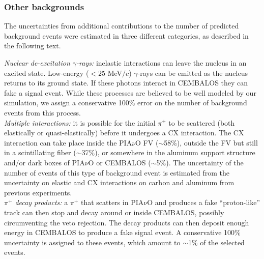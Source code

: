 \subsubsection{\bf Other backgrounds}\label{sec:background}
The uncertainties from additional contributions to the number of predicted background events were estimated in three different categories, as described in the following text.

{ \it Nuclear de-excitation $\gamma$-rays:} inelastic interactions can leave the nucleus in an excited state. Low-energy ($<25$ MeV$/c$) $\gamma$-rays can be emitted as the nucleus returns to its ground state. If these photons interact in CEMBALOS they can fake a signal event. While these processes are believed to be well modeled by our simulation, we assign a conservative 100\% error on the number of background events from this process.\\

{ \it Multiple interactions: } it is possible for the initial $\pi^{+}$ to be scattered (both elastically or quasi-elastically) before it undergoes a CX interaction. The CX interaction can take place inside the PIA$\nu$O FV ($\sim$58\%), outside the FV but still in a scintillating fiber ($\sim$37\%), or somewhere in the aluminum support structure and/or dark boxes of PIA$\nu$O or CEMBALOS ($\sim$5\%). The uncertainty of the number of events of this type of background event is estimated from the uncertainty on elastic and CX interactions on carbon and aluminum from previous experiments.\\

{ \it $\pi^{+}$ decay products: } a $\pi^{+}$ that scatters in PIA$\nu$O and produces a fake ``proton-like'' track can then stop and decay around or inside CEMBALOS, possibly circumventing the veto rejection. The decay products can then deposit enough energy in CEMBALOS to produce a fake signal event. A conservative 100\% uncertainty is assigned to these events, which amount to $\sim$1\% of the selected events. %


